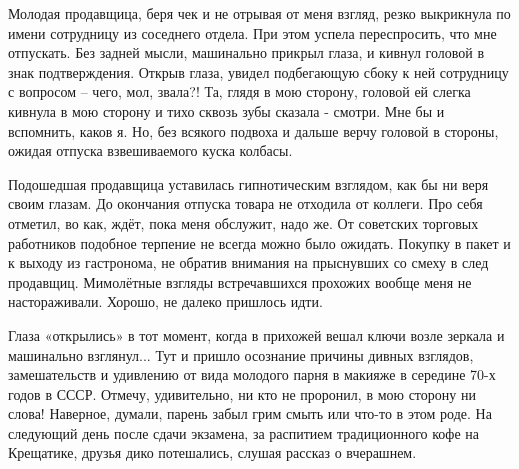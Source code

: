 Молодая продавщица, беря чек и не отрывая от меня взгляд, резко выкрикнула по
имени сотрудницу из соседнего отдела. При этом успела переспросить, что мне
отпускать. Без задней мысли, машинально прикрыл глаза, и кивнул головой в знак
подтверждения. Открыв глаза, увидел подбегающую сбоку к ней сотрудницу с
вопросом – чего, мол, звала?! Та, глядя в мою сторону, головой ей слегка
кивнула в мою сторону и тихо сквозь зубы сказала - смотри.  Мне бы и вспомнить,
каков я.  Но, без всякого подвоха и дальше верчу головой в стороны, ожидая
отпуска взвешиваемого куска колбасы. 

Подошедшая продавщица   уставилась   гипнотическим взглядом, как бы ни веря
своим глазам.  До окончания отпуска товара  не отходила от коллеги. Про себя
отметил, во как,  ждёт, пока меня обслужит, надо же. От советских торговых
работников подобное терпение не всегда можно было ожидать.  Покупку в пакет и к
выходу из гастронома, не обратив внимания на прыснувших со смеху в след
продавщиц.  Мимолётные взгляды встречавшихся прохожих вообще меня не
настораживали. Хорошо, не далеко пришлось идти.

Глаза «открылись»  в тот момент, когда в прихожей вешал ключи возле зеркала
и машинально взглянул...   Тут и пришло осознание причины дивных взглядов,
замешательств и удивлению  от вида молодого парня в макияже в середине 70-х
годов в СССР. Отмечу, удивительно, ни кто не проронил, в мою сторону ни слова!
Наверное,  думали, парень забыл грим смыть или что-то в этом роде. На следующий
день после сдачи экзамена, за распитием традиционного кофе на Крещатике, друзья
дико потешались, слушая рассказ о вчерашнем.
